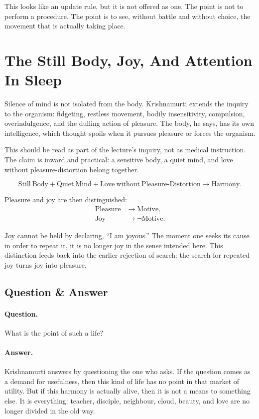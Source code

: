 This looks like an update rule, but it is not offered as one. The point is not to perform a procedure. The point is to see, without battle and without choice, the movement that is actually taking place.

\section{The Still Body, Joy, And Attention In Sleep}

Silence of mind is not isolated from the body. Krishnamurti extends the inquiry to the organism: fidgeting, restless movement, bodily insensitivity, compulsion, overindulgence, and the dulling action of pleasure. The body, he says, has its own intelligence, which thought spoils when it pursues pleasure or forces the organism.

This should be read as part of the lecture's inquiry, not as medical instruction. The claim is inward and practical: a sensitive body, a quiet mind, and love without pleasure-distortion belong together.

\begin{equation}
\mathrm{Still\ Body}
+
\mathrm{Quiet\ Mind}
+
\mathrm{Love\ without\ Pleasure\text{-}Distortion}
\longrightarrow
\mathrm{Harmony}.
\end{equation}

Pleasure and joy are then distinguished:
\begin{align}
\mathrm{Pleasure} &\longrightarrow \mathrm{Motive},\\
\mathrm{Joy} &\longrightarrow \neg \mathrm{Motive}.
\end{align}

Joy cannot be held by declaring, ``I am joyous.'' The moment one seeks its cause in order to repeat it, it is no longer joy in the sense intended here. This distinction feeds back into the earlier rejection of search: the search for repeated joy turns joy into pleasure.

\subsection{Question \& Answer}

\paragraph{Question.}
What is the point of such a life?

\paragraph{Answer.}
Krishnamurti answers by questioning the one who asks. If the question comes as a demand for usefulness, then this kind of life has no point in that market of utility. But if this harmony is actually alive, then it is not a means to something else. It is everything: teacher, disciple, neighbour, cloud, beauty, and love are no longer divided in the old way.

